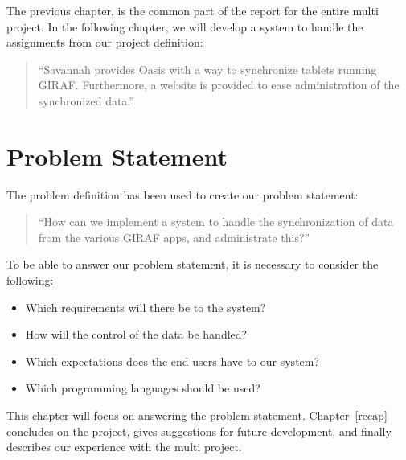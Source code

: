 The previous chapter, is the common part of the report for the entire multi project. In the following chapter, we will develop a system to handle the assignments from our project definition:
\begin{quotation}
``Savannah provides Oasis with a way to synchronize tablets running GIRAF. Furthermore, a website is provided to ease administration of the synchronized data.''
\end{quotation}

\section{Problem Statement}
The problem definition has been used to create our problem statement:
\begin{quotation}
``How can we implement a system to handle the synchronization of data from the various GIRAF apps, and administrate this?''
\end{quotation}

To be able to answer our problem statement, it is necessary to consider the following:
\begin{itemize}
	\item Which requirements will there be to the system?
	\item How will the control of the data be handled?
	\item Which expectations does the end users have to our system?
	\item Which programming languages should be used?
\end{itemize}

This chapter will focus on answering the problem statement. Chapter~\ref{recap} concludes on the project, gives suggestions for future development, and finally describes our experience with the multi project.